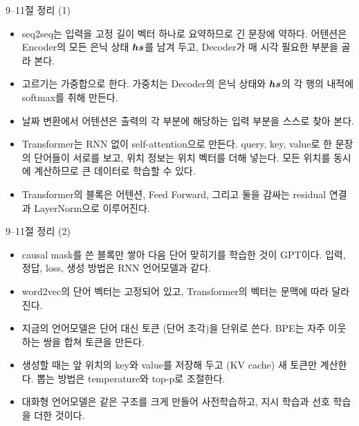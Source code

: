\documentclass[aspectratio=169,11pt]{beamer}
\begin{document}
\begin{frame}{9--11절 정리 (1)}
\begin{mlbox}[9--11절 정리]
\small
\begin{itemize}
\item seq2seq는 입력을 고정 길이 벡터 하나로 요약하므로 긴 문장에 약하다.
  어텐션은 Encoder의 모든 은닉 상태 $\bm{hs}$를 남겨 두고, Decoder가 매 시각 필요한 부분을
  골라 본다.
\item 고르기는 가중합으로 한다. 가중치는 Decoder의 은닉 상태와 $\bm{hs}$의 각 행의 내적에
  softmax를 취해 만든다.
\item 날짜 변환에서 어텐션은 출력의 각 부분에 해당하는 입력 부분을 스스로 찾아 본다.
\item Transformer는 RNN 없이 self-attention으로 만든다.
  query, key, value로 한 문장의 단어들이 서로를 보고, 위치 정보는 위치 벡터를 더해 넣는다.
  모든 위치를 동시에 계산하므로 큰 데이터로 학습할 수 있다.
\item Transformer의 블록은 어텐션, Feed Forward, 그리고 둘을 감싸는 residual 연결과
  LayerNorm으로 이루어진다.
\end{itemize}
\end{mlbox}
\end{frame}

\begin{frame}{9--11절 정리 (2)}
\begin{mlbox}[9--11절 정리]
\small
\begin{itemize}
\item causal mask를 쓴 블록만 쌓아 다음 단어 맞히기를 학습한 것이 GPT이다.
  입력, 정답, loss, 생성 방법은 RNN 언어모델과 같다.
\item word2vec의 단어 벡터는 고정되어 있고, Transformer의 벡터는 문맥에 따라 달라진다.
\item 지금의 언어모델은 단어 대신 토큰 (단어 조각)을 단위로 쓴다.
  BPE는 자주 이웃하는 쌍을 합쳐 토큰을 만든다.
\item 생성할 때는 앞 위치의 key와 value를 저장해 두고 (KV cache) 새 토큰만 계산한다.
  뽑는 방법은 temperature와 top-p로 조절한다.
\item 대화형 언어모델은 같은 구조를 크게 만들어 사전학습하고, 지시 학습과 선호 학습을 더한 것이다.
\end{itemize}
\end{mlbox}
\end{frame}
\end{document}
